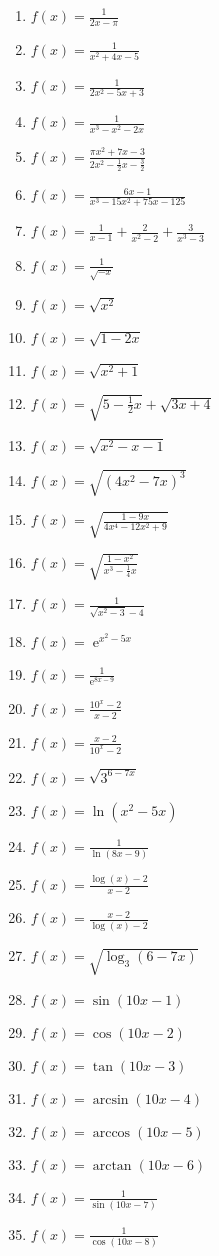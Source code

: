 \documentclass[a4paper,12pt]{article}
\DeclareMathOperator{\e}{e}
\begin{document}
\begin{multicols}{2}
\begin{enumerate}
\item $f(x)=\frac{1}{2x-\pi}$
\item $f(x)=\frac{1}{x^2+4x-5}$
\item $f(x)=\frac{1}{2x^2-5x+3}$
\item $f(x)=\frac{1}{x^3-x^2-2x}$
\item $f(x)=\frac{\pi x^2 +7x -3}{2x^2-\frac{1}{2}x-\frac{3}{2}}$
\item $f(x)=\frac{6x-1}{x^3-15x^2+75x-125}$
\item $f(x)=\frac{1}{x-1}+\frac{2}{x^2-2}+\frac{3}{x^3-3}$
\item $f(x)=\frac{1}{\sqrt{-x}}$
\item $f(x)=\sqrt{x^2}$
\item $f(x)=\sqrt{1-2x}$
\item $f(x)=\sqrt{x^2+1}$
\item $f(x)=\sqrt{5-\frac{1}{2}x}+\sqrt{3x+4}$
\item $f(x)=\sqrt{x^2-x-1}$
\item $f(x)=\sqrt{(4x^2-7x)^3}$
\item $f(x)=\sqrt{\frac{1-9x}{4x^4-12x^2+9}}$
\item $f(x)=\sqrt{\frac{1-x^2}{x^3-\frac{1}{4}x}}$
\item $f(x)=\frac{1}{\sqrt{x^2-3}-4}$
\item $f(x)=\e^{x^2-5x}$
\item $f(x)=\frac{1}{\e^{8x-9}}$
\item $f(x)=\frac{10^x-2}{x-2}$
\item $f(x)=\frac{x-2}{10^x-2}$
\item $f(x)=\sqrt{3^{6-7x}}$
\item $f(x)=\ln\left(x^2-5x\right)$
\item $f(x)=\frac{1}{\ln\left(8x-9\right)}$
\item $f(x)=\frac{\log(x)-2}{x-2}$
\item $f(x)=\frac{x-2}{\log(x)-2}$
\item $f(x)=\sqrt{\log_3(6-7x)}$
\item $f(x)=\sin(10x-1)$
\item $f(x)=\cos(10x-2)$
\item $f(x)=\tan(10x-3)$
\item $f(x)=\arcsin(10x-4)$
\item $f(x)=\arccos(10x-5)$
\item $f(x)=\arctan(10x-6)$
\item $f(x)=\frac{1}{\sin(10x-7)}$
\item $f(x)=\frac{1}{\cos(10x-8)}$

\end{enumerate}
\end{multicols}
\end{document}
